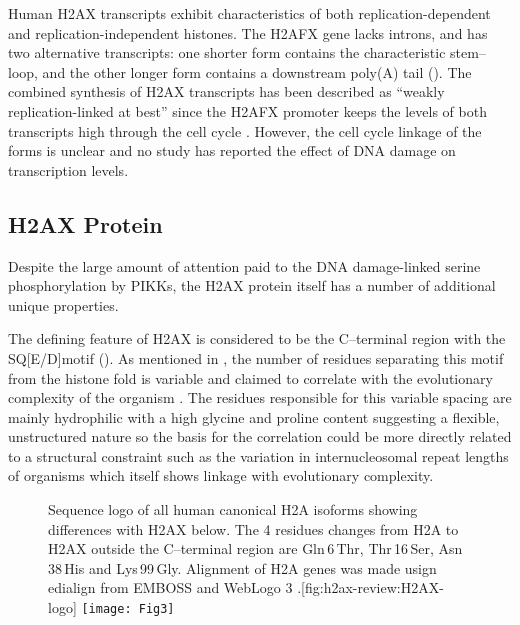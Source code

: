 Human H2AX transcripts exhibit characteristics of both replication-dependent and replication-independent
histones. The H2AFX gene lacks introns, and has two alternative transcripts: one shorter form contains
the characteristic stem--loop, and the other longer form contains a downstream poly(A) tail \citep{CMWMB89}
(). The combined synthesis of H2AX transcripts has been described as ``weakly
replication-linked at best'' since the H2AFX promoter keeps the levels of both transcripts high
through the cell cycle \citep{VSI94}. However, the cell cycle linkage of the forms is unclear and no
study has reported the effect of DNA damage on transcription levels.

\subsection{H2AX Protein}
\label{subsec:h2ax-review:H2AX-protein}
Despite the large amount of attention paid to the DNA damage-linked serine phosphorylation by PIKKs,
the H2AX protein itself has a number of additional unique properties.

The defining feature of H2AX is considered to be the C--terminal region with the SQ[E/D]\textPhi motif
(). As mentioned in , the number of
residues separating this motif from the histone fold is variable and claimed to correlate with the
evolutionary complexity of the organism \citep{CRDP+02}. The residues responsible for this variable
spacing are mainly hydrophilic with a high glycine and proline content suggesting a flexible,
unstructured nature so the basis for the correlation could be more directly related to a structural
constraint such as the variation in internucleosomal repeat lengths of organisms which itself shows
linkage with evolutionary complexity.

\begin{figure}
\begin{sidecaption}{Sequence logo of all human canonical H2A isoforms showing differences with H2AX below. The
4 residues changes from H2A to H2AX outside the C--terminal region are Gln\,6\,Thr, Thr\,16\,Ser, Asn\,38\,His
and Lys\,99\,Gly. Alignment of H2A genes was made usign edialign \protect\citep{Mor99} from EMBOSS
\protect\citep{RLB00} and WebLogo 3 \protect\citep{CHC+04}.}[fig:h2ax-review:H2AX-logo]
\centering
\texttt{[image: Fig3]}
\end{sidecaption}
\end{figure}

